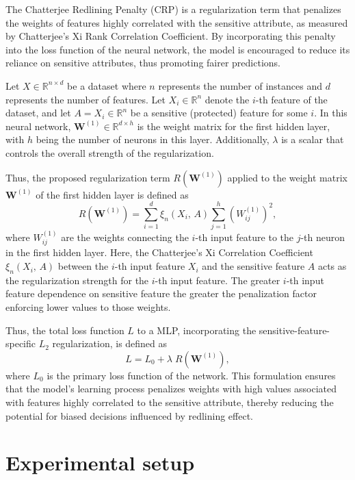 The Chatterjee Redlining Penalty (CRP) is a regularization term that penalizes the weights of features highly correlated with the sensitive attribute, as measured by Chatterjee's Xi Rank Correlation Coefficient. By incorporating this penalty into the loss function of the neural network, the model is encouraged to reduce its reliance on sensitive attributes, thus promoting fairer predictions.

Let $X \in \mathbb{R}^{n \times d}$ be a dataset where $n$ represents the number of instances and $d$ represents the number of features. Let $X_i \in \mathbb{R}^n$ denote the $i$-th feature of the dataset, and let $A = X_i \in \mathbb{R}^n$ be a sensitive (protected) feature for some $i$. In this neural network, $\mathbf{W}^{(1)} \in \mathbb{R}^{d \times h}$ is the weight matrix for the first hidden layer, with $h$ being the number of neurons in this layer. Additionally, $\lambda$ is a scalar that controls the overall strength of the regularization.

Thus, the proposed regularization term $R(\mathbf{W}^{(1)})$ applied to the weight matrix $\mathbf{W}^{(1)}$ of the first hidden layer is defined as 
\begin{equation}\label{eq:xi_reg}
R(\mathbf{W}^{(1)}) = \sum_{i=1}^d \xi_n(X_i,\,A) \sum_{j=1}^h (W^{(1)}_{ij})^2,
\end{equation}
where $W^{(1)}_{ij}$ are the weights connecting the $i$-th input feature to the $j$-th neuron in the first hidden layer. Here, the Chatterjee's Xi Correlation Coefficient $\xi_n(X_i,\,A)$ between the $i$-th input feature $X_i$ and the sensitive feature $A$ acts as the regularization strength for the $i$-th input feature. The greater $i$-th input feature dependence on sensitive feature the greater the penalization factor enforcing lower values to those weights.

Thus, the total loss function $L$ to a MLP, incorporating the sensitive-feature-specific $L_2$ regularization, is defined as
\begin{equation}\label{eq:total_regularized_loss}
L = L_0 + \lambda \; R(\mathbf{W}^{(1)}),
\end{equation}
where $L_0$ is the primary loss function of the network. This formulation ensures that the model's learning process penalizes weights with high values associated with features highly correlated to the sensitive attribute, thereby reducing the potential for biased decisions influenced by redlining effect.

\section{Experimental setup}

